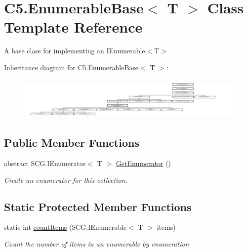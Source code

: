 \hypertarget{class_c5_1_1_enumerable_base}{}\section{C5.\+Enumerable\+Base$<$ T $>$ Class Template Reference}
\label{class_c5_1_1_enumerable_base}


A base class for implementing an I\+Enumerable$<$T$>$  


Inheritance diagram for C5.\+Enumerable\+Base$<$ T $>$\+:\begin{figure}[H]
\begin{center}
\leavevmode
\includegraphics[height=2.109228cm]{class_c5_1_1_enumerable_base}
\end{center}
\end{figure}
\subsection*{Public Member Functions}
\begin{DoxyCompactItemize}
\item 
abstract S\+C\+G.\+I\+Enumerator$<$ T $>$ \hyperlink{class_c5_1_1_enumerable_base_ad8893620ea9cc4e7d41c17d26769d237}{Get\+Enumerator} ()
\begin{DoxyCompactList}\small\item\em Create an enumerator for this collection. \end{DoxyCompactList}\end{DoxyCompactItemize}
\subsection*{Static Protected Member Functions}
\begin{DoxyCompactItemize}
\item 
static int \hyperlink{class_c5_1_1_enumerable_base_ad696d9c2a4370aa2e7611961bf3f815a}{count\+Items} (S\+C\+G.\+I\+Enumerable$<$ T $>$ items)
\begin{DoxyCompactList}\small\item\em Count the number of items in an enumerable by enumeration \end{DoxyCompactList}\end{DoxyCompactItemize}


